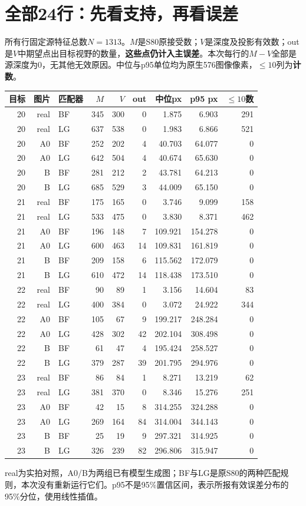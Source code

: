 \documentclass[UTF8,11pt,a4paper]{ctexart}
\begin{document}
\section{ 全部24行：先看支持，再看误差}
所有行固定源特征总数$N=1313$。$M$是S80原接受数；$V$是深度及投影有效数；out是$V$中期望点出目标视野的数量，\textbf{这些点仍计入主误差}。本次每行的$M-V$全部是源深度为0，无其他无效原因。中位与p95单位均为原生576图像像素，$\le10$列为\textbf{计数}。

\begin{center}\small
\setlength{\tabcolsep}{5pt}
\begin{tabular}{rrlrrrrrr}
\toprule 目标&图片&匹配器&$M$&$V$&out&中位px&p95 px&$\le10$数\\\midrule
20 & real & BF & 345 & 300 & 0 & 1.875 & 6.903 & 291 \\
20 & real & LG & 637 & 538 & 0 & 1.983 & 6.866 & 521 \\
20 & A0 & BF & 252 & 202 & 4 & 40.703 & 64.077 & 0 \\
20 & A0 & LG & 642 & 504 & 4 & 40.674 & 65.630 & 0 \\
20 & B & BF & 281 & 212 & 2 & 43.781 & 64.213 & 0 \\
20 & B & LG & 685 & 529 & 3 & 44.009 & 65.150 & 0 \\
21 & real & BF & 175 & 165 & 0 & 3.746 & 9.099 & 158 \\
21 & real & LG & 533 & 475 & 0 & 3.830 & 8.371 & 462 \\
21 & A0 & BF & 196 & 148 & 7 & 109.921 & 154.278 & 0 \\
21 & A0 & LG & 600 & 463 & 14 & 109.831 & 161.819 & 0 \\
21 & B & BF & 209 & 158 & 6 & 115.562 & 172.079 & 0 \\
21 & B & LG & 610 & 472 & 14 & 118.438 & 173.510 & 0 \\
22 & real & BF & 90 & 89 & 1 & 3.156 & 14.604 & 83 \\
22 & real & LG & 400 & 384 & 0 & 3.072 & 24.922 & 344 \\
22 & A0 & BF & 105 & 67 & 9 & 199.217 & 248.284 & 0 \\
22 & A0 & LG & 428 & 302 & 42 & 202.104 & 308.498 & 0 \\
22 & B & BF & 61 & 47 & 4 & 195.424 & 258.527 & 0 \\
22 & B & LG & 379 & 287 & 39 & 201.795 & 294.976 & 0 \\
23 & real & BF & 86 & 84 & 1 & 8.271 & 13.219 & 62 \\
23 & real & LG & 381 & 370 & 0 & 8.346 & 15.276 & 251 \\
23 & A0 & BF & 42 & 15 & 8 & 314.255 & 324.288 & 0 \\
23 & A0 & LG & 269 & 164 & 84 & 314.004 & 344.143 & 0 \\
23 & B & BF & 25 & 19 & 9 & 297.321 & 314.925 & 0 \\
23 & B & LG & 326 & 239 & 82 & 296.806 & 315.947 & 0 \\
\bottomrule
\end{tabular}\end{center}
\noindent real为实拍对照，A0/B为两组已有模型生成图；BF与LG是原S80的两种匹配规则，本次没有重新运行它们。p95不是95\%置信区间，表示所报有效误差分布的95\%分位，使用线性插值。
\end{document}
